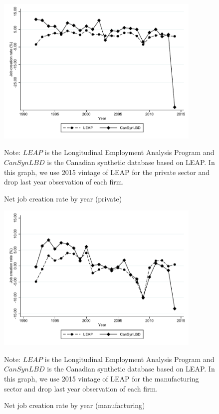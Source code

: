 \documentclass{article}
\begin{document}
\begin{figure} [H]
\centering
\caption{Net job creation rate by year (private)} \label{NetJobCreationPrivate}
\includegraphics[height=2.8in, width=.7\linewidth]{graphs/Net_job_creation_rate_by_year_private_bw.pdf} 
\begin{minipage}{0.85\textwidth}
{\footnotesize Note: $LEAP$ is the Longitudinal Employment Analysis Program and $CanSynLBD$ is the Canadian synthetic database based on LEAP. In this graph, we use 2015 vintage of LEAP for the private sector and drop last year observation of each firm. \par}
\end{minipage}
\end{figure}
\begin{figure} [H]
\centering
\caption{Net job creation rate  by year (manufacturing)} \label{NetJobCreationManufacturing}
\includegraphics[height=2.8in, width=.7\linewidth]{graphs/Net_job_creation_rate_by_year_Manufacturing_bw.pdf} 
\begin{minipage}{0.85\textwidth}
{\footnotesize Note: $LEAP$ is the Longitudinal Employment Analysis Program and $CanSynLBD$ is the Canadian synthetic database based on LEAP. In this graph, we use 2015 vintage of LEAP for the manufacturing sector and drop last year observation of each firm. \par}
\end{minipage}
\end{figure}
\end{document}
